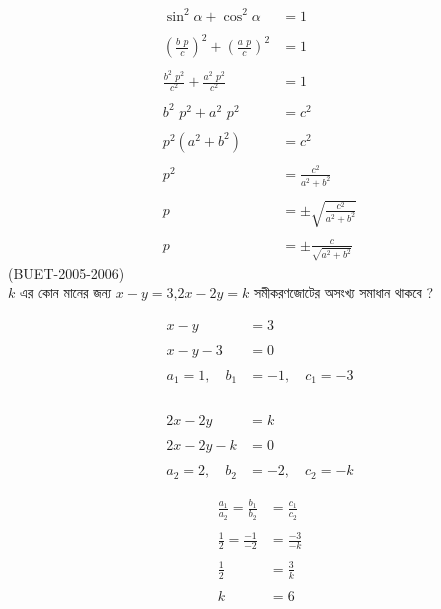 \documentclass{article}
\begin{document}
\begin{align*}
	\sin^2 \alpha+\cos^2 \alpha &=1\\
	\\
	\left(\frac{b\,\,p}{c}\right)^2+\left(\frac{a\,\,p}{c}\right)^2&=1\\
	\\
	\frac{b^2\,\,p^2}{c^2}+\frac{a^2\,\,p^2}{c^2}&=1\\
	\\
	b^2\,\,p^2+a^2\,\,p^2&=c^2\\
	\\
	p^2(a^2+b^2)&=c^2\\
	\\
	p^2&=\frac{c^2}{a^2+b^2}\\
	\\
	p&=\pm \sqrt{\frac{c^2}{a^2+b^2}}\\
	\\
	p&=\pm \frac{c}{\sqrt{a^2+b^2}}
\end{align*}
	(BUET-2005-2006) \\
	$k$ এর কোন মানের জন্য  $x-y=3$,\qquad $2x-2y=k$ সমীকরণজোটের অসংখ্য সমাধান থাকবে ?\\
	\begin{multicols}{2}
	\begin{align*}
		x-y&=3\\
		\\
		x-y-3&=0\\
		\\
		a_1=1,\quad b_1&=-1,\quad c_1=-3\\
	\end{align*}
	\\
	\begin{align*}
		2x-2y&=k\\
		\\
		2x-2y-k&=0\\
		\\
		a_2=2,\quad b_2&=-2,\quad c_2=-k
	\end{align*}
	\end{multicols}
\begin{align*}
	\frac{a_1}{a_2}=\frac{b_1}{b_2}&=\frac{c_1}{c_2}\\
	\\
	\frac{1}{2}=\frac{-1}{-2}&=\frac{-3}{-k}\\
	\\
	\frac{1}{2}&=\frac{3}{k}\\
	\\
	k&=6
\end{align*}
\\
\end{document}
